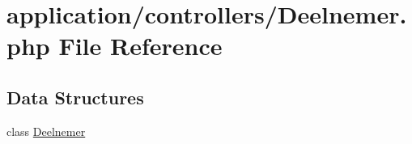 \hypertarget{_deelnemer_8php}{}\section{application/controllers/\+Deelnemer.php File Reference}
\label{_deelnemer_8php}
\subsection*{Data Structures}
\begin{DoxyCompactItemize}
\item 
class \mbox{\hyperlink{class_deelnemer}{Deelnemer}}
\end{DoxyCompactItemize}
